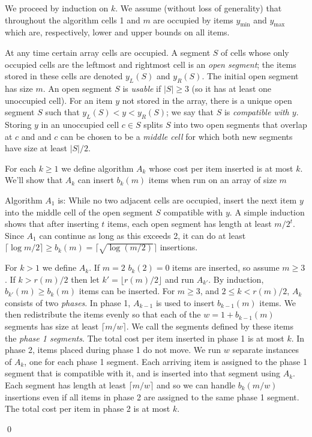 \documentclass[unicode,review]{siamart1116}
\newenvironment{proofof}[1]{\noindent{\textbf { Proof of #1:}}} {{\qed}}
\numberwithin{theorem}{section}
\providecommand{\DIFadd}[1]{{\protect\color{blue}\uwave{#1}}} %
\providecommand{\DIFaddbegin}{} %
\providecommand{\DIFaddend}{} %
\newcommand{\DIFaddincludegraphics}[2][]{{\color{blue}\fbox{\DIFOincludegraphics[#1]{#2}}}} %
\DeclareRobustCommand{\DIFaddbegin}{\DIFOaddbegin \let\includegraphics\DIFaddincludegraphics} %
\DeclareRobustCommand{\DIFaddend}{\DIFOaddend \let\includegraphics\DIFOincludegraphics} %
\begin{document}
\begin{proofof}{\Cref{thm:ub}}
We proceed by induction on $k$. We assume (without loss of generality) that throughout the algorithm
cells 1 and $m$ are occupied by items $y_{\min}$ and $y_{\max}$ which are, respectively, lower and upper bounds
on all items.   

At any time certain array cells are occupied.   A segment $S$ of cells whose only occupied cells are the leftmost and rightmost cell is an {\em open segment};
the items stored in these cells
are denoted $y_L(S)$ and $y_R(S)$. The initial open segment has size $m$.  
An open segment $S$ is {\em usable} if $|S| \geq 3$ (so it has at least one unoccupied cell).
For an item $y$ not stored in the array, there is a unique open segment $S$ such that
$y_L(S)<y<y_R(S)$; we say that $S$ is  {\em compatible with $y$}.
Storing $y$ in an unoccupied cell  $c \in S$ splits $S$   into two open
segments that overlap at $c$ and
and $c$ can be chosen to be a {\em middle cell} for which both new segments have size at least $|S|/2$. 

\iffalse
 More generally, it can be checked that given $q-1$ items to be placed in an open
interval $S$ that has at least $q-1$ unoccupied spaces we can place them evenly so that each of the $q$
open segments produced has size at least $|S|/q$.  (The worst case is $|S|=aq+1)$ for some integer $a$, and
in this case each of the $q$ resulting subsegments has length $a+1 \geq |S|/q$.)
\fi


For each $k \geq 1$ we define algorithm $A_k$ whose cost per item
inserted is at most $k$.  We'll show that $A_k$ can insert $b_k(m)$ items when
run on an array of size $m$\DIFaddbegin \DIFadd{.
}\DIFaddend 

 Algorithm $A_1$ is: While  no two adjacent cells are occupied, insert the next item $y$ into the middle cell of the
open segment $S$ compatible with $y$.
A simple induction shows that after inserting $t$ items, each open segment has length at least $m/2^t$. Since $A_1$ can continue as long as this exceeds 2, it can
do
at least $\lceil \log m/2 \rceil  \geq b_k(m)=\lceil \sqrt{\log (m/2)} \rceil $ insertions.


For $k>1$ we define $A_k$.  If  $m=2$   $b_k(2)=0$ items are inserted,
so assume $m \geq 3$.  If $k > r(m)/2$ then let $k'=\lfloor r(m)/2 \rfloor$ and run $A_{k'}$.
By induction, $b_{k'}(m) \geq b_k(m)$ items can be inserted.
For $m \geq 3$, and $2 \leq k < r(m)/2$, $A_k$ consists of two {\em phases}.  In phase 1,  $A_{k-1}$ is
used to insert $b_{k-1}(m)$ items.
We then redistribute the items evenly so that each of the $w=1+b_{k-1}(m)$ segments has size
at least $\lceil m/w \rceil$.  
We call the segments defined by these items the {\em phase 1 segments}.   
The total cost per item inserted in phase 1  is at most $k$.
In phase 2, items placed during phase 1 do not move. 
We run $w$ separate instances of $A_k$, one for each  phase 1 segment. Each arriving item is assigned to the phase 1 segment that is compatible with it,
and is inserted into that segment using $A_k$.  Each segment has length at least $\lceil m/w \rceil $ and so we can handle $b_k(m/w)$ insertions 
even if all items in phase 2 are assigned to the same phase 1 segment. The total
cost per item in phase 2 is at most $k$.


\end{proofof}
\end{document}
